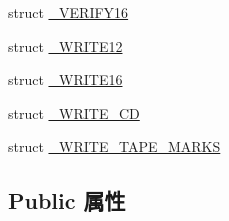 \begin{DoxyCompactItemize}
\item 
struct \hyperlink{struct___c_d_b_1_1___v_e_r_i_f_y16}{\+\_\+\+V\+E\+R\+I\+F\+Y16}
\item 
struct \hyperlink{struct___c_d_b_1_1___w_r_i_t_e12}{\+\_\+\+W\+R\+I\+T\+E12}
\item 
struct \hyperlink{struct___c_d_b_1_1___w_r_i_t_e16}{\+\_\+\+W\+R\+I\+T\+E16}
\item 
struct \hyperlink{struct___c_d_b_1_1___w_r_i_t_e___c_d}{\+\_\+\+W\+R\+I\+T\+E\+\_\+\+CD}
\item 
struct \hyperlink{struct___c_d_b_1_1___w_r_i_t_e___t_a_p_e___m_a_r_k_s}{\+\_\+\+W\+R\+I\+T\+E\+\_\+\+T\+A\+P\+E\+\_\+\+M\+A\+R\+KS}
\end{DoxyCompactItemize}
\subsection*{Public 属性}
